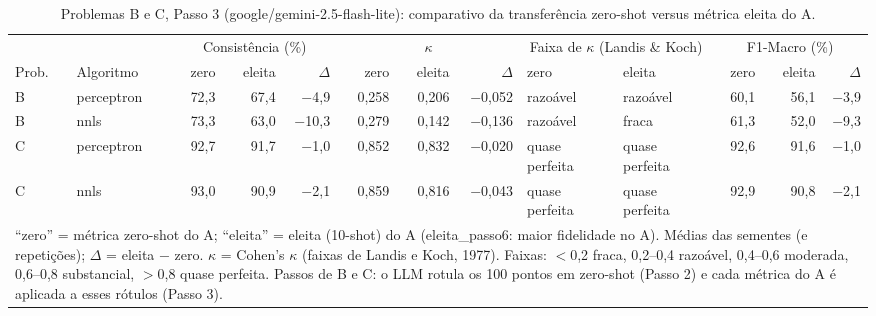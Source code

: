 \begin{table}[htbp]
\centering
\footnotesize
\caption{Problemas B e C, Passo 3 (google/gemini-2.5-flash-lite): comparativo da transferência zero-shot versus métrica eleita do A.}
\label{tab:BC_passo3_zero_vs_eleita_flashlite}
\begin{tabular}{llrrrrrrllrrr}
\toprule
 &  & \multicolumn{3}{c}{Consistência (\%)} & \multicolumn{3}{c}{$\kappa$} & \multicolumn{2}{c}{Faixa de $\kappa$ (Landis \& Koch)} & \multicolumn{3}{c}{F1-Macro (\%)} \\ \cmidrule(lr){3-5} \cmidrule(lr){6-8} \cmidrule(lr){9-10} \cmidrule(lr){11-13}
Prob. & Algoritmo & zero & eleita & $\Delta$ & zero & eleita & $\Delta$ & zero & eleita & zero & eleita & $\Delta$ \\
\midrule
B & perceptron & 72,3 & 67,4 & $-$4,9 & 0,258 & 0,206 & $-$0,052 & razoável & razoável & 60,1 & 56,1 & $-$3,9 \\
B & nnls & 73,3 & 63,0 & $-$10,3 & 0,279 & 0,142 & $-$0,136 & razoável & fraca & 61,3 & 52,0 & $-$9,3 \\
\midrule
C & perceptron & 92,7 & 91,7 & $-$1,0 & 0,852 & 0,832 & $-$0,020 & quase perfeita & quase perfeita & 92,6 & 91,6 & $-$1,0 \\
C & nnls & 93,0 & 90,9 & $-$2,1 & 0,859 & 0,816 & $-$0,043 & quase perfeita & quase perfeita & 92,9 & 90,8 & $-$2,1 \\
\bottomrule
\multicolumn{13}{p{0.95\linewidth}}{\footnotesize ``zero'' = métrica zero-shot do A; ``eleita'' = eleita (10-shot) do A (eleita\_passo6: maior fidelidade no A). Médias das sementes (e repetições); $\Delta$ = eleita $-$ zero. $\kappa$ = Cohen's $\kappa$ (faixas de Landis e Koch, 1977). Faixas: $<$0,2 fraca, 0,2–0,4 razoável, 0,4–0,6 moderada, 0,6–0,8 substancial, $>$0,8 quase perfeita. Passos de B e C: o LLM rotula os 100 pontos em zero-shot (Passo 2) e cada métrica do A é aplicada a esses rótulos (Passo 3).} \\
\end{tabular}
\end{table}
